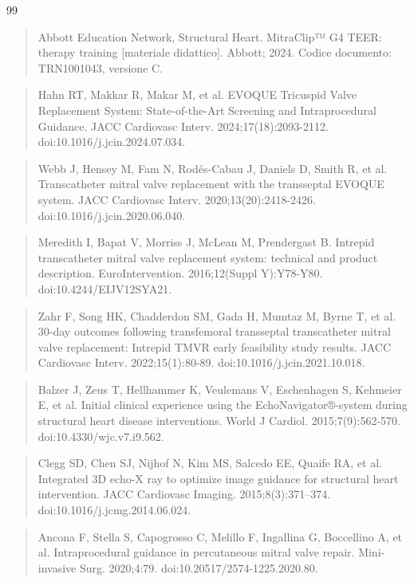 \documentclass[12pt,a4paper,twoside]{article}
\begin{document}
\begin{thebibliography}{99}
\begin{quote}
  Abbott Education Network, Structural Heart. MitraClip™ G4 TEER: therapy training {[}materiale didattico{]}. Abbott; 2024. Codice documento: TRN1001043, versione C.
  \end{quote}
  \begin{quote}
  Hahn RT, Makkar R, Makar M, et al. EVOQUE Tricuspid Valve Replacement System: State-of-the-Art Screening and Intraprocedural Guidance. JACC Cardiovasc Interv. 2024;17(18):2093-2112. doi:10.1016/j.jcin.2024.07.034.
  \end{quote}
  \begin{quote}
  Webb J, Hensey M, Fam N, Rodés-Cabau J, Daniels D, Smith R, et al. Transcatheter mitral valve replacement with the transseptal EVOQUE system. JACC Cardiovasc Interv. 2020;13(20):2418-2426. doi:10.1016/j.jcin.2020.06.040.
  \end{quote}
  \begin{quote}
  Meredith I, Bapat V, Morriss J, McLean M, Prendergast B. Intrepid transcatheter mitral valve replacement system: technical and product description. EuroIntervention. 2016;12(Suppl Y):Y78-Y80. doi:10.4244/EIJV12SYA21.
  \end{quote}
  \begin{quote}
  Zahr F, Song HK, Chadderdon SM, Gada H, Mumtaz M, Byrne T, et al. 30-day outcomes following transfemoral transseptal transcatheter mitral valve replacement: Intrepid TMVR early feasibility study results. JACC Cardiovasc Interv. 2022;15(1):80-89. doi:10.1016/j.jcin.2021.10.018.
  \end{quote}
  \begin{quote}
  Balzer J, Zeus T, Hellhammer K, Veulemans V, Eschenhagen S, Kehmeier E, et al. Initial clinical experience using the EchoNavigator®-system during structural heart disease interventions. World J Cardiol. 2015;7(9):562-570. doi:10.4330/wjc.v7.i9.562.
  \end{quote}
  \begin{quote}
  Clegg SD, Chen SJ, Nijhof N, Kim MS, Salcedo EE, Quaife RA, et al. Integrated 3D echo-X ray to optimize image guidance for structural heart intervention. JACC Cardiovasc Imaging. 2015;8(3):371--374. doi:10.1016/j.jcmg.2014.06.024.
  \end{quote}
  \begin{quote}
  Ancona F, Stella S, Capogrosso C, Melillo F, Ingallina G, Boccellino A, et al. Intraprocedural guidance in percutaneous mitral valve repair. Mini-invasive Surg. 2020;4:79. doi:10.20517/2574-1225.2020.80.

\end{quote}
\end{thebibliography}
\end{document}
